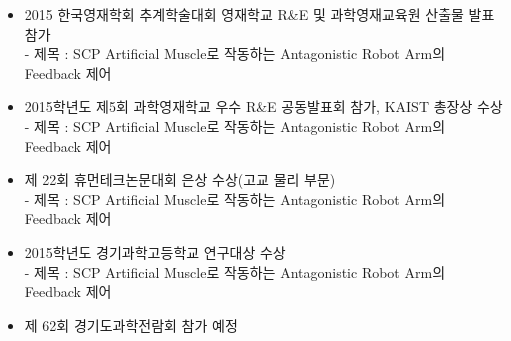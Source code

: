 \begin{researches}
\begin{itemize}
\item{2015 한국영재학회 추계학술대회 영재학교 R\&E 및 과학영재교육원 산출물 발표 참가}
\\ - 제목 : SCP Artificial Muscle로 작동하는 Antagonistic Robot Arm의 Feedback 제어
\item{2015학년도 제5회 과학영재학교 우수 R\&E 공동발표회 참가, KAIST 총장상 수상}
\\ - 제목 : SCP Artificial Muscle로 작동하는 Antagonistic Robot Arm의 Feedback 제어
\item{제 22회 휴먼테크논문대회 은상 수상(고교 물리 부문)}
\\ - 제목 : SCP Artificial Muscle로 작동하는 Antagonistic Robot Arm의 Feedback 제어
\item{2015학년도 경기과학고등학교 연구대상 수상}
\\ - 제목 : SCP Artificial Muscle로 작동하는 Antagonistic Robot Arm의 Feedback 제어
\item{제 62회	경기도과학전람회 참가 예정}
\end{itemize}
\end{researches}

 
